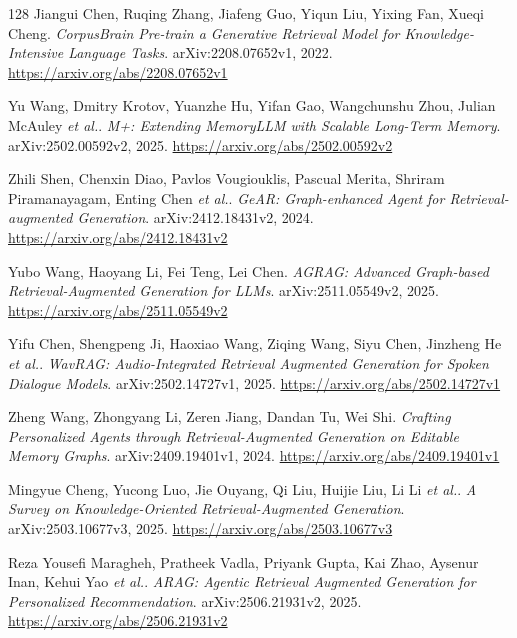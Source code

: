 \documentclass[11pt,a4paper]{article}
\begin{document}
\begin{thebibliography}{128}
Jiangui Chen, Ruqing Zhang, Jiafeng Guo, Yiqun Liu, Yixing Fan, Xueqi Cheng.
\newblock \emph{CorpusBrain Pre-train a Generative Retrieval Model for Knowledge-Intensive Language Tasks}.
\newblock arXiv:2208.07652v1, 2022.
\newblock \url{https://arxiv.org/abs/2208.07652v1}

Yu Wang, Dmitry Krotov, Yuanzhe Hu, Yifan Gao, Wangchunshu Zhou, Julian McAuley \emph{et al.}.
\newblock \emph{M+: Extending MemoryLLM with Scalable Long-Term Memory}.
\newblock arXiv:2502.00592v2, 2025.
\newblock \url{https://arxiv.org/abs/2502.00592v2}

Zhili Shen, Chenxin Diao, Pavlos Vougiouklis, Pascual Merita, Shriram Piramanayagam, Enting Chen \emph{et al.}.
\newblock \emph{GeAR: Graph-enhanced Agent for Retrieval-augmented Generation}.
\newblock arXiv:2412.18431v2, 2024.
\newblock \url{https://arxiv.org/abs/2412.18431v2}

Yubo Wang, Haoyang Li, Fei Teng, Lei Chen.
\newblock \emph{AGRAG: Advanced Graph-based Retrieval-Augmented Generation for LLMs}.
\newblock arXiv:2511.05549v2, 2025.
\newblock \url{https://arxiv.org/abs/2511.05549v2}

Yifu Chen, Shengpeng Ji, Haoxiao Wang, Ziqing Wang, Siyu Chen, Jinzheng He \emph{et al.}.
\newblock \emph{WavRAG: Audio-Integrated Retrieval Augmented Generation for Spoken Dialogue Models}.
\newblock arXiv:2502.14727v1, 2025.
\newblock \url{https://arxiv.org/abs/2502.14727v1}

Zheng Wang, Zhongyang Li, Zeren Jiang, Dandan Tu, Wei Shi.
\newblock \emph{Crafting Personalized Agents through Retrieval-Augmented Generation on Editable Memory Graphs}.
\newblock arXiv:2409.19401v1, 2024.
\newblock \url{https://arxiv.org/abs/2409.19401v1}

Mingyue Cheng, Yucong Luo, Jie Ouyang, Qi Liu, Huijie Liu, Li Li \emph{et al.}.
\newblock \emph{A Survey on Knowledge-Oriented Retrieval-Augmented Generation}.
\newblock arXiv:2503.10677v3, 2025.
\newblock \url{https://arxiv.org/abs/2503.10677v3}

Reza Yousefi Maragheh, Pratheek Vadla, Priyank Gupta, Kai Zhao, Aysenur Inan, Kehui Yao \emph{et al.}.
\newblock \emph{ARAG: Agentic Retrieval Augmented Generation for Personalized Recommendation}.
\newblock arXiv:2506.21931v2, 2025.
\newblock \url{https://arxiv.org/abs/2506.21931v2}


\end{thebibliography}
\end{document}
